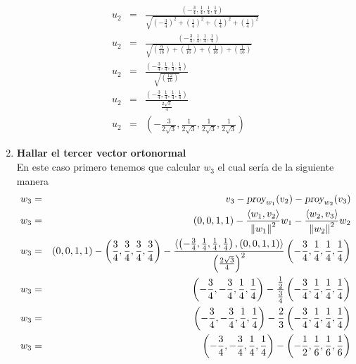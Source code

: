 \begin{enumerate}
\begin{eqnarray}
        {u}_{2} &=& \frac{\left(- \frac{3}{4}, \frac{1}{4}, \frac{1}{4}, \frac{1}{4} \right)}{\sqrt{{\left(-\frac{3}{4} \right)}^{2}+{\left(\frac{1}{4} \right)}^{2}+{\left(\frac{1}{4} \right)}^{2}+{\left(\frac{1}{4} \right)}^{2}}} \nonumber \\
        {u}_{2} &=& \frac{\left(- \frac{3}{4}, \frac{1}{4}, \frac{1}{4}, \frac{1}{4} \right)}{\sqrt{\left(\frac{9}{16}\right) + \left(\frac{1}{16}\right) + \left(\frac{1}{16}\right) + \left(\frac{1}{16}\right) }} \nonumber \\
        {u}_{2} &=& \frac{\left(- \frac{3}{4}, \frac{1}{4}, \frac{1}{4}, \frac{1}{4} \right)}{\sqrt{\left( \frac{12}{16} \right) }} \nonumber \\
        {u}_{2} &=& \frac{\left(- \frac{3}{4}, \frac{1}{4}, \frac{1}{4}, \frac{1}{4} \right)}{\frac{2\sqrt{3}}{4}} \nonumber \\
        {u}_{2} &=& \left(- \frac{3}{2 \sqrt{3}}, \frac{1}{2 \sqrt{3}}, \frac{1}{2 \sqrt{3}}, \frac{1}{2 \sqrt{3}} \right) \nonumber
    \end{eqnarray}
    \item \textbf{Hallar el tercer vector ortonormal}\\
    En este caso primero tenemos que calcular ${w}_{3}$ el cual sería de la siguiente manera
    \begin{eqnarray}
        {w}_{3} &=& {v}_{3} - {\textsl{proy}}_{{w}_{1}}({v}_{2}) - {\textsl{proy}}_{{w}_{2}}({v}_{3}) \nonumber \\
        {w}_{3} &=& (0,0,1,1) - \frac{\langle {w}_{1}, {v}_{2} \rangle}{{\| {w}_{1} \|}^{2}} {w}_{1} - \frac{\langle {w}_{2}, {v}_{3} \rangle}{{\| {w}_{2} \|}^{2}} {w}_{2} \nonumber \\
        {w}_{3} &=& (0,0,1,1) - \left( \frac{3}{4}, \frac{3}{4}, \frac{3}{4}, \frac{3}{4} \right) - \frac{\langle \left(- \frac{3}{4}, \frac{1}{4}, \frac{1}{4}, \frac{1}{4} \right), (0,0,1,1) \rangle}{{\left( \frac{2\sqrt{3}}{4} \right)}^{2}} \left(- \frac{3}{4}, \frac{1}{4}, \frac{1}{4}, \frac{1}{4} \right) \nonumber \\
        {w}_{3} &=& \left(- \frac{3}{4},- \frac{3}{4}, \frac{1}{4}, \frac{1}{4} \right) - \frac{\frac{1}{2}}{\frac{3}{4}} \left(- \frac{3}{4}, \frac{1}{4}, \frac{1}{4}, \frac{1}{4} \right) \nonumber \\
        {w}_{3} &=& \left(- \frac{3}{4},- \frac{3}{4}, \frac{1}{4}, \frac{1}{4} \right) - \frac{2}{3} \left(- \frac{3}{4}, \frac{1}{4}, \frac{1}{4}, \frac{1}{4} \right) \nonumber \\
        {w}_{3} &=& \left(- \frac{3}{4},- \frac{3}{4}, \frac{1}{4}, \frac{1}{4} \right) - \left(- \frac{1}{2}, \frac{1}{6}, \frac{1}{6}, \frac{1}{6} \right)  \nonumber \\

\end{eqnarray}
\end{enumerate}
